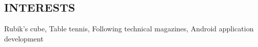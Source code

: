 \documentclass[2pt]{res}
\begin{document}
\begin{resume}

\section{INTERESTS}
Rubik's cube, Table tennis, Following technical magazines, Android application development
\end{resume}
\end{document}
